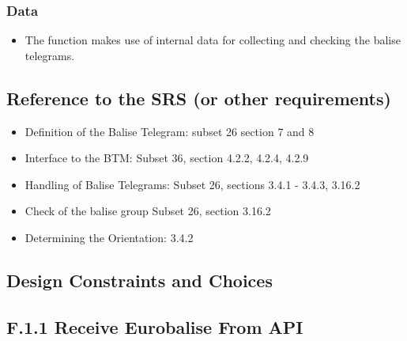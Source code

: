 \documentclass{template/openetcs_report}
\begin{document}
\subsubsection{Data}
\begin{itemize}
\item The function makes use of internal data for collecting and checking the balise telegrams. 
\end{itemize}

\subsection{Reference to the SRS (or other requirements)}
\begin{itemize}
\item Definition of the Balise Telegram: subset 26 section 7 and 8\\
\item Interface to the BTM: Subset 36, section  4.2.2, 4.2.4, 4.2.9\\
\item Handling of Balise Telegrams: Subset 26, sections 3.4.1 - 3.4.3, 3.16.2 \\
\item Check of the balise group Subset 26, section 3.16.2\\
\item Determining the Orientation: 3.4.2\\
\end{itemize}

\subsection{Design Constraints and Choices}


\subsection{F.1.1 Receive Eurobalise From API}\label{ss:ReceiveEurobaliseFromAPI}
\end{document}
